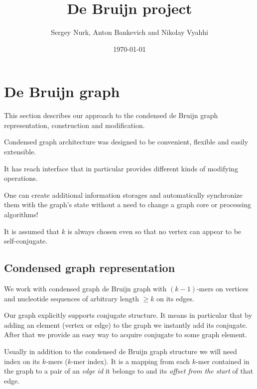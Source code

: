 \documentclass[12pt]{article}
\title{De Bruijn project}
\author{Sergey Nurk, Anton Bankevich and Nikolay Vyahhi}
\date{\today}
\newcommand{\dbg}{de Bruijn graph}
\begin{document}
\maketitle

\tableofcontents

\section{De Bruijn graph}

This section describes our approach to the condensed \dbg{} representation, construction and modification.

Condensed graph architecture was designed to be convenient, flexible and easily extensible. 

It has reach interface that in particular provides different kinds of modifying operations. 

One can create additional information storages and automatically synchronize them with the graph's state without a need to change a graph core or processing algorithms!


It is assumed that $k$ is always chosen even so that no vertex can appear to be self-conjugate.

\subsection{Condensed graph representation}

We work with condensed graph \dbg{} with $(k-1)$-mers on vertices and nucleotide sequences of arbitrary length $\geq k$ on its edges.

Our graph explicitly supports conjugate structure. It means in particular that by adding an element (vertex or edge) to the graph we instantly add its conjugate. After that we provide an easy way to acquire conjugate to some graph element.

Usually in addition to the condensed \dbg{} structure we will need index on its $k$-mers ($k$-mer index). It is a mapping from each $k$-mer contained in the graph to a pair of an \emph{edge id} it belongs to and its \emph{offset from the start} of that edge. 
\end{document}

